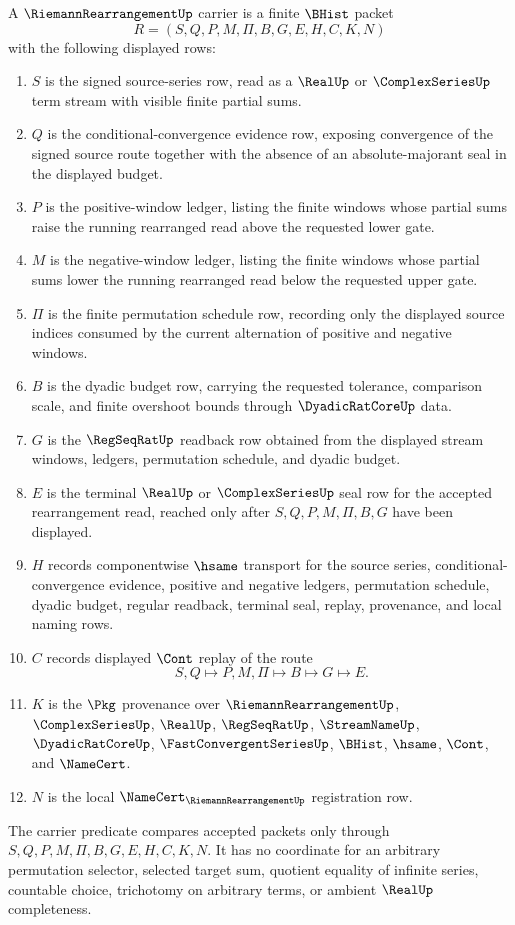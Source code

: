\begin{definition}
\label{def:riemann-rearrangement-carrier}
A $\RiemannRearrangementUp$ carrier is a finite $\BHist$ packet
$$
R=(S,Q,P,M,\Pi,B,G,E,H,C,K,N)
$$
with the following displayed rows:
\begin{enumerate}
\item $S$ is the signed source-series row, read as a $\RealUp$ or $\ComplexSeriesUp$ term stream with visible finite partial sums.
\item $Q$ is the conditional-convergence evidence row, exposing convergence of the signed source route together with the absence of an absolute-majorant seal in the displayed budget.
\item $P$ is the positive-window ledger, listing the finite windows whose partial sums raise the running rearranged read above the requested lower gate.
\item $M$ is the negative-window ledger, listing the finite windows whose partial sums lower the running rearranged read below the requested upper gate.
\item $\Pi$ is the finite permutation schedule row, recording only the displayed source indices consumed by the current alternation of positive and negative windows.
\item $B$ is the dyadic budget row, carrying the requested tolerance, comparison scale, and finite overshoot bounds through $\DyadicRatCoreUp$ data.
\item $G$ is the $\RegSeqRatUp$ readback row obtained from the displayed stream windows, ledgers, permutation schedule, and dyadic budget.
\item $E$ is the terminal $\RealUp$ or $\ComplexSeriesUp$ seal row for the accepted rearrangement read, reached only after $S,Q,P,M,\Pi,B,G$ have been displayed.
\item $H$ records componentwise $\hsame$ transport for the source series, conditional-convergence evidence, positive and negative ledgers, permutation schedule, dyadic budget, regular readback, terminal seal, replay, provenance, and local naming rows.
\item $C$ records displayed $\Cont$ replay of the route
$$
S,Q \longmapsto P,M,\Pi \longmapsto B \longmapsto G \longmapsto E .
$$
\item $K$ is the $\Pkg$ provenance over $\RiemannRearrangementUp$, $\ComplexSeriesUp$, $\RealUp$, $\RegSeqRatUp$, $\StreamNameUp$, $\DyadicRatCoreUp$, $\FastConvergentSeriesUp$, $\BHist$, $\hsame$, $\Cont$, and $\NameCert$.
\item $N$ is the local $\NameCert_{\RiemannRearrangementUp}$ registration row.
\end{enumerate}
The carrier predicate compares accepted packets only through $S,Q,P,M,\Pi,B,G,E,H,C,K,N$. It has no coordinate for an arbitrary permutation selector, selected target sum, quotient equality of infinite series, countable choice, trichotomy on arbitrary terms, or ambient $\RealUp$ completeness.
\end{definition}

